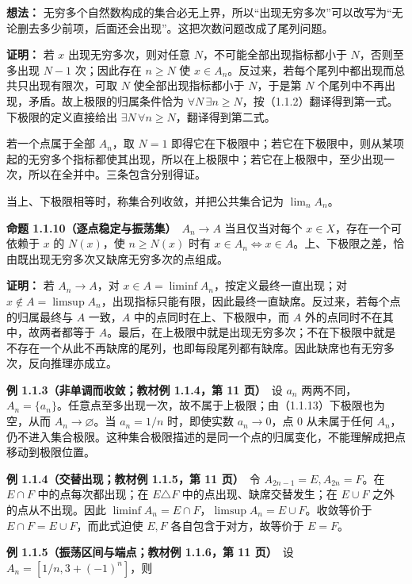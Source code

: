 \documentclass[11pt,a4paper]{article}
\begin{document}
\textbf{想法：}
无穷多个自然数构成的集合必无上界，所以``出现无穷多次''可以改写为``无论删去多少前项，后面还会出现''。这把次数问题改成了尾列问题。

\textbf{证明：} 若 \(x\) 出现无穷多次，则对任意
\(N\)，不可能全部出现指标都小于 \(N\)，否则至多出现 \(N-1\) 次；因此存在
\(n\ge N\) 使
\(x\in A_n\)。反过来，若每个尾列中都出现而总共只出现有限次，可取 \(N\)
使全部出现指标都小于 \(N\)，于是第 \(N\)
个尾列中不再出现，矛盾。故上极限的归属条件恰为
\(\forall N\,\exists n\ge N\)，按（1.1.2）翻译得到第一式。下极限的定义直接给出
\(\exists N\,\forall n\ge N\)，翻译得到第二式。

若一个点属于全部 \(A_n\)，取 \(N=1\)
即得它在下极限中；若它在下极限中，则从某项起的无穷多个指标都使其出现，所以在上极限中；若它在上极限中，至少出现一次，所以在全并中。三条包含分别得证。

当上、下极限相等时，称集合列收敛，并把公共集合记为 \(\lim_n A_n\)。

\textbf{命题 1.1.10（逐点稳定与振荡集）}　\(A_n\to A\) 当且仅当对每个
\(x\in X\)，存在一个可依赖于 \(x\) 的 \(N(x)\)，使 \(n\ge N(x)\) 时有
\(x\in A_n\iff x\in A\)。上、下极限之差，恰由既出现无穷多次又缺席无穷多次的点组成。

\textbf{证明：} 若 \(A_n\to A\)，对
\(x\in A=\liminf A_n\)，按定义最终一直出现；对
\(x\notin A=\limsup A_n\)，出现指标只能有限，因此最终一直缺席。反过来，若每个点的归属最终与
\(A\) 一致，\(A\) 中的点同时在上、下极限中，而 \(A\)
外的点同时不在其中，故两者都等于
\(A\)。最后，在上极限中就是出现无穷多次；不在下极限中就是不存在一个从此不再缺席的尾列，也即每段尾列都有缺席。因此缺席也有无穷多次，反向推理亦成立。

\textbf{例 1.1.3（非单调而收敛；教材例 1.1.4，第 11 页）}　设 \(a_n\)
两两不同，\(A_n=\{a_n\}\)。任意点至多出现一次，故不属于上极限；由（1.1.13）下极限也为空，从而
\(A_n\to\varnothing\)。当 \(a_n=1/n\) 时，即使实数 \(a_n\to0\)，点 \(0\)
从未属于任何
\(A_n\)，仍不进入集合极限。这种集合极限描述的是同一个点的归属变化，不能理解成把点移动到极限位置。

\textbf{例 1.1.4（交替出现；教材例 1.1.5，第 11 页）}　令
\(A_{2n-1}=E,A_{2n}=F\)。在 \(E\cap F\) 中的点每次都出现；在
\(E\triangle F\) 中的点出现、缺席交替发生；在 \(E\cup F\)
之外的点从不出现。因此
\(\liminf A_n=E\cap F\)，\(\limsup A_n=E\cup F\)。收敛等价于
\(E\cap F=E\cup F\)，而此式迫使 \(E,F\) 各自包含于对方，故等价于
\(E=F\)。

\textbf{例 1.1.5（振荡区间与端点；教材例 1.1.6，第 11 页）}　设
\(A_n=[1/n,3+(-1)^n]\)，则
\end{document}

